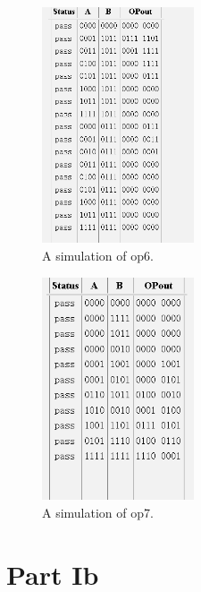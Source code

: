 \documentclass{article}
\begin{document}
\begin{enumerate}
\begin{figure}[ht!]
    \centering
    \includegraphics[width=0.4\textwidth]{lab4_op6_simulation.png}
    \caption{A simulation of op6.}
    \label{f:op6_simulation}
\end{figure}

\begin{figure}[ht!]
    \centering
    \includegraphics[width=0.4\textwidth]{lab4_op7_simulation.png}
    \caption{A simulation of op7.}
    \label{f:op7_simulation}
\end{figure}


\end{enumerate}

\section*{Part Ib}
\end{document}

